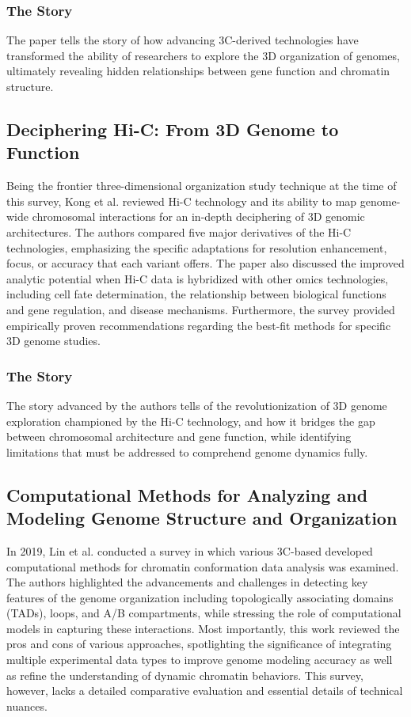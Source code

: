 \subsubsection{The Story}
The paper tells the story of how advancing 3C-derived technologies have transformed the ability of researchers to explore the 3D organization of genomes, ultimately revealing hidden relationships between gene function and chromatin structure.

\subsection{Deciphering Hi-C: From 3D Genome to Function}
Being the frontier three-dimensional organization study technique at the time of this survey, Kong et al. \cite{kong_deciphering_2019} reviewed Hi-C technology and its ability to map genome-wide chromosomal interactions for an in-depth deciphering of 3D genomic architectures. The authors compared five major derivatives of the Hi-C technologies, emphasizing the specific adaptations for resolution enhancement, focus, or accuracy that each variant offers. The paper also discussed the improved analytic potential when Hi-C data is hybridized with other omics technologies, including cell fate determination, the relationship between biological functions and gene regulation, and disease mechanisms. Furthermore, the survey provided empirically proven recommendations regarding the best-fit methods for specific 3D genome studies.

\subsubsection{The Story}
The story advanced by the authors tells of the revolutionization of 3D genome exploration championed by the Hi-C technology, and how it bridges the gap between chromosomal architecture and gene function, while identifying limitations that must be addressed to comprehend genome dynamics fully.

\subsection{Computational Methods for Analyzing and Modeling Genome Structure and Organization}
In 2019, Lin et al. \cite{lin_computational_2019} conducted a survey in which various 3C-based developed computational methods for chromatin conformation data analysis was examined. The authors highlighted the advancements and challenges in detecting key features of the genome organization including topologically associating domains (TADs), loops, and A/B compartments, while stressing the role of computational models in capturing these interactions. Most importantly, this work reviewed the pros and cons of various approaches, spotlighting the significance of integrating multiple experimental data types to improve genome modeling accuracy as well as refine the understanding of dynamic chromatin behaviors. This survey, however, lacks a detailed comparative evaluation and essential details of technical nuances.
